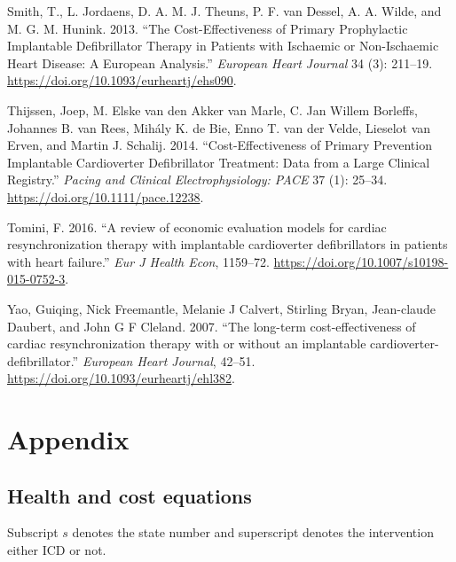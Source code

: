 \documentclass[
]{article}
\newlength{\cslhangindent}
\newlength{\cslentryspacingunit} %
\newenvironment{CSLReferences}[2] %
 {%
  \setlength{\parindent}{0pt}
  \ifodd #1
  \let\oldpar\par
  \def\par{\hangindent=\cslhangindent\oldpar}
  \fi
  \setlength{\parskip}{#2\cslentryspacingunit}
 }%
 {}
\begin{document}
\begin{CSLReferences}{1}{0}
\leavevmode{}%
Smith, T., L. Jordaens, D. A. M. J. Theuns, P. F. van Dessel, A. A.
Wilde, and M. G. M. Hunink. 2013. {``The Cost-Effectiveness of Primary
Prophylactic Implantable Defibrillator Therapy in Patients with
Ischaemic or Non-Ischaemic Heart Disease: A European Analysis.''}
\emph{European Heart Journal} 34 (3): 211--19.
\url{https://doi.org/10.1093/eurheartj/ehs090}.

\leavevmode{}%
Thijssen, Joep, M. Elske van den Akker van Marle, C. Jan Willem
Borleffs, Johannes B. van Rees, Mihály K. de Bie, Enno T. van der Velde,
Lieselot van Erven, and Martin J. Schalij. 2014. {``Cost-Effectiveness
of Primary Prevention Implantable Cardioverter Defibrillator Treatment:
Data from a Large Clinical Registry.''} \emph{Pacing and Clinical
Electrophysiology: PACE} 37 (1): 25--34.
\url{https://doi.org/10.1111/pace.12238}.

\leavevmode{}%
Tomini, F. 2016. {``{A review of economic evaluation models for cardiac
resynchronization therapy with implantable cardioverter defibrillators
in patients with heart failure}.''} \emph{Eur J Health Econ}, 1159--72.
\url{https://doi.org/10.1007/s10198-015-0752-3}.

\leavevmode{}%
Yao, Guiqing, Nick Freemantle, Melanie J Calvert, Stirling Bryan,
Jean-claude Daubert, and John G F Cleland. 2007. {``{The long-term
cost-effectiveness of cardiac resynchronization therapy with or without
an implantable cardioverter-defibrillator}.''} \emph{European Heart
Journal}, 42--51. \url{https://doi.org/10.1093/eurheartj/ehl382}.

\end{CSLReferences}

\newpage

\hypertarget{appendix}{%
\section{Appendix}\label{appendix}}

\hypertarget{health-and-cost-equations}{%
\subsection{Health and cost equations}\label{health-and-cost-equations}}

Subscript \(s\) denotes the state number and superscript denotes the
intervention either ICD or not.
\end{document}
